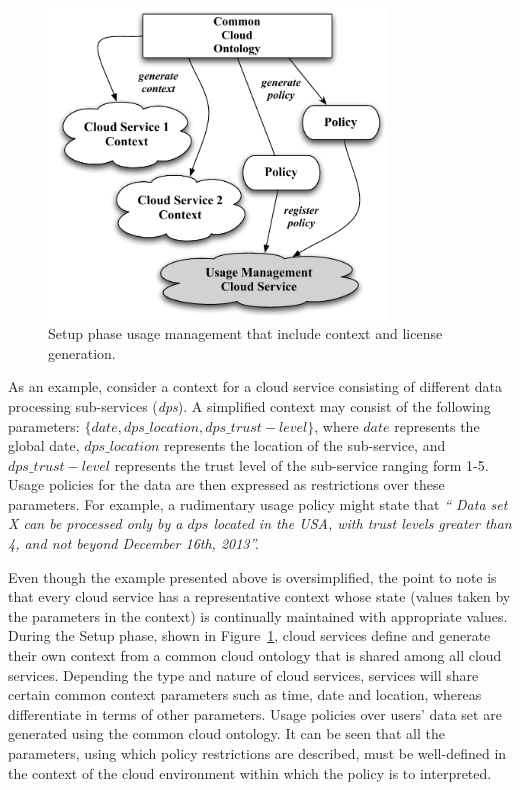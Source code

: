 \documentclass[notitlepage]{book}
\begin{document}
\begin{doublespace}
\begin{figure}[t]
\centering
\includegraphics[width=9cm]{cloud-setup}
\caption{Setup phase usage management that include context and license generation.}
\label{fig:cloud-setup}
\end{figure}



As an example, consider a context for a cloud service consisting of  different data processing sub-services ({\em dps}). A simplified context may consist of the following parameters: $\{date, dps\_location, dps\_trust-level \}$, where $date$ represents the global date, $dps\_location$ represents the location of the sub-service, and $dps\_trust-level$ represents the trust level of the sub-service ranging form 1-5. Usage policies for the data are then expressed as restrictions over these parameters. For example, a rudimentary usage policy might state that {\em `` Data set X can be processed only by a $dps$ located in the USA, with trust levels greater than 4, and not beyond December 16th, 2013''. }

Even though the example presented above is oversimplified, the point to note is that every cloud service has a representative context whose state (values taken by the parameters in the context) is continually maintained with appropriate values. During the Setup phase, shown in Figure~\ref{fig:cloud-setup}, cloud services define and generate their own context from a common cloud ontology that is shared among all cloud services. Depending the type and nature of cloud services, services will share certain common context parameters such as time, date and location, whereas differentiate in terms of other parameters. Usage policies over users' data set are generated using the common cloud ontology. It can be seen that all the parameters, using which policy restrictions are described, must be well-defined in the context of the cloud environment within which the policy is to interpreted.


\end{doublespace}
\end{document}
